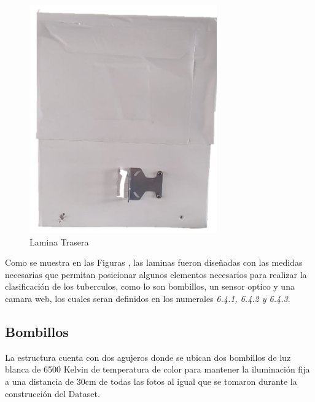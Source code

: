 \begin{figure}[H]
\begin{minipage}[b]{0.35\linewidth}
				\includegraphics[width=\linewidth]{Figs/303.png}
				\caption{Lamina Trasera}
				\label{fig:trasera}
			\end{minipage}
		\end{figure}
				
		Como se muestra en las Figuras , las laminas fueron diseñadas con las medidas necesarias que permitan posicionar algunos elementos necesarios para realizar la clasificación de los tuberculos, como lo son bombillos, un sensor optico y una camara web, los cuales seran definidos en los numerales \textit{6.4.1, 6.4.2 y 6.4.3}.

		\subsection{Bombillos}
			La estructura cuenta con dos agujeros donde se ubican dos bombillos de luz blanca de 6500 Kelvin de temperatura de color para mantener la iluminación fija a una distancia de 30cm de todas las fotos al igual que se tomaron durante la construcción del Dataset.
